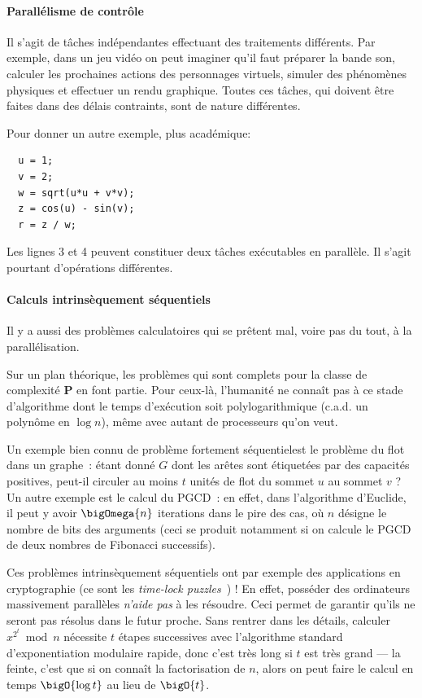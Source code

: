 \paragraph{Parallélisme de contrôle} Il s'agit de tâches indépendantes
effectuant des traitements différents. Par exemple, dans un jeu vidéo on peut
imaginer qu'il faut préparer la bande son, calculer les prochaines actions des
personnages virtuels, simuler des phénomènes physiques et effectuer un rendu
graphique. Toutes ces tâches, qui doivent être faites dans des délais
contraints, sont de nature différentes.

Pour donner un autre exemple, plus \og académique\fg :
\medskip 
\begin{verbatim}
  u = 1;
  v = 2;
  w = sqrt(u*u + v*v);
  z = cos(u) - sin(v);
  r = z / w; 
\end{verbatim}

Les lignes 3 et 4 peuvent constituer deux tâches exécutables en parallèle. Il
s'agit pourtant d'opérations différentes.

\paragraph{Calculs intrinsèquement séquentiels} Il y a aussi des problèmes
calculatoires qui se prêtent mal, voire pas du tout, à la parallélisation.

Sur un plan théorique, les problèmes qui sont complets pour la classe de
complexité \textbf{P} en font partie. Pour ceux-là, l'humanité ne connaît pas à
ce stade d'algorithme dont le temps d'exécution soit polylogarithmique
(c.a.d. un polynôme en $\log n$), même avec autant de processeurs qu'on veut.

Un exemple bien connu de problème \og fortement séquentiel\fg est le problème du
flot dans un graphe~: étant donné $G$ dont les arêtes sont étiquetées par des
capacités positives, peut-il circuler au moins $t$ unités de flot du sommet $u$
au sommet $v$ ? Un autre exemple est le calcul du PGCD~: en effet, dans
l'algorithme d'Euclide, il peut y avoir $\bigOmega{n}$ iterations dans le pire
des cas, où $n$ désigne le nombre de bits des arguments (ceci se produit
notamment si on calcule le PGCD de deux nombres de Fibonacci successifs).

Ces problèmes intrinsèquement séquentiels ont par exemple des applications en
cryptographie (ce sont les \og \textit{time-lock
  puzzles}~\cite{time-lock-puzzles}) ! En effet, posséder des ordinateurs
massivement parallèles \emph{n'aide pas} à les résoudre. Ceci permet de garantir
qu'ils ne seront pas résolus dans le futur proche. Sans rentrer dans les
détails, calculer $x^{2^t} \bmod n$ nécessite $t$ étapes successives avec
l'algorithme standard d'exponentiation modulaire rapide, donc c'est très long si
$t$ est très grand --- la feinte, c'est que si on connaît la factorisation de
$n$, alors on peut faire le calcul en temps $\bigO{\log t}$ au lieu de
$\bigO{t}$.

